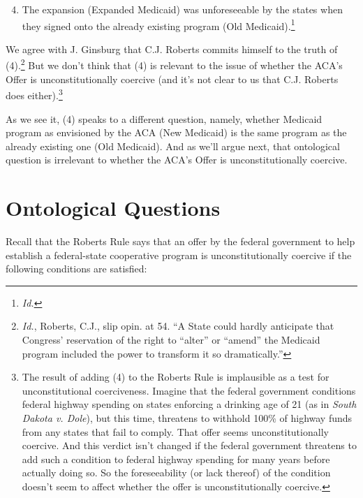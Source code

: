 \begin{enumerate}
\setcounter{enumi}{3}
\item The expansion (Expanded Medicaid) was unforeseeable by the states when they sign\-ed onto the already existing program (Old Medicaid).\footnote{\emph{Id.}}

\end{enumerate}
We agree with J. Ginsburg that C.J. Roberts commits himself to the truth of (4).\footnote{\emph{Id.}, Roberts, C.J., slip opin. at 54. ``A State could hardly anticipate that Congress' reservation of the right to ``alter'' or ``amend'' the Medicaid program included the power to transform it so dramatically.''} But we don't think that (4) is relevant to the issue of whether the ACA's Offer is unconstitutionally coercive (and it's not clear to us that C.J. Roberts does either).\footnote{The result of adding (4) to the Roberts Rule is implausible as a test for unconstitutional coerciveness. Imagine that the federal government conditions federal highway spending on states enforcing a drinking age of 21 (as in \emph{South Dakota v. Dole}), but this time, threatens to withhold 100\% of highway funds from any states that fail to comply. That offer seems unconstitutionally coercive. And this verdict isn't changed if the federal government threatens to add such a condition to federal highway spending for many years before actually doing so. So the foreseeability (or lack thereof) of the condition doesn't seem to affect whether the offer is unconstitutionally coercive.} 

As we see it, (4) speaks to a different question, namely, whether Medicaid program as envisioned by the ACA (New Medicaid) is the same program as the already existing one (Old Medicaid). And as we'll argue next, that ontological question is irrelevant to whether the ACA's Offer is unconstitutionally coercive.

\section{Ontological Questions
}
Recall that the Roberts Rule says that an offer by the federal government to help establish a federal-state cooperative program is unconstitutionally coercive if the following conditions are satisfied: 

